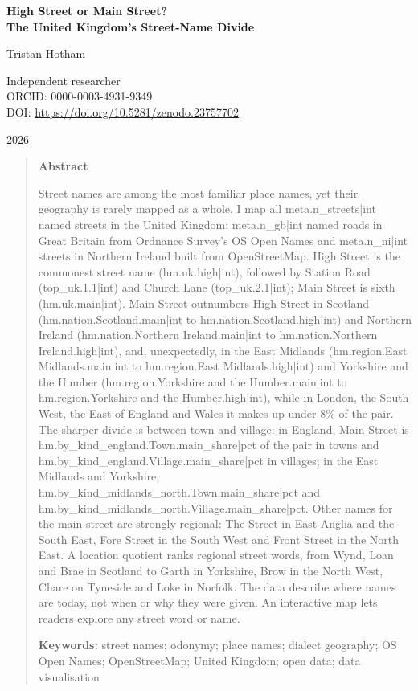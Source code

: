 \documentclass[11pt,a4paper]{article}
\begin{document}
\begin{center}
{\Large\bfseries High Street or Main Street?\\[2pt] The United Kingdom's Street-Name Divide\par}
\vspace{1.2em}
{\large Tristan Hotham\par}
\vspace{0.3em}
{\small Independent researcher\\
ORCID: 0000-0003-4931-9349\\
DOI: \href{https://doi.org/10.5281/zenodo.23757702}{https://doi.org/10.5281/zenodo.23757702}\par}
\vspace{0.8em}
2026
\end{center}

\begin{quote}
\small
\begin{center}\textbf{Abstract}\end{center}
Street names are among the most familiar place names, yet their geography is rarely mapped as a whole. I map all {{meta.n_streets|int}} named streets in the United Kingdom: {{meta.n_gb|int}} named roads in Great Britain from Ordnance Survey's OS Open Names and {{meta.n_ni|int}} streets in Northern Ireland built from OpenStreetMap. High Street is the commonest street name ({{hm.uk.high|int}}), followed by Station Road ({{top_uk.1.1|int}}) and Church Lane ({{top_uk.2.1|int}}); Main Street is sixth ({{hm.uk.main|int}}). Main Street outnumbers High Street in Scotland ({{hm.nation.Scotland.main|int}} to {{hm.nation.Scotland.high|int}}) and Northern Ireland ({{hm.nation.Northern Ireland.main|int}} to {{hm.nation.Northern Ireland.high|int}}), and, unexpectedly, in the East Midlands ({{hm.region.East Midlands.main|int}} to {{hm.region.East Midlands.high|int}}) and Yorkshire and the Humber ({{hm.region.Yorkshire and the Humber.main|int}} to {{hm.region.Yorkshire and the Humber.high|int}}), while in London, the South West, the East of England and Wales it makes up under 8\% of the pair. The sharper divide is between town and village: in England, Main Street is {{hm.by_kind_england.Town.main_share|pct}} of the pair in towns and {{hm.by_kind_england.Village.main_share|pct}} in villages; in the East Midlands and Yorkshire, {{hm.by_kind_midlands_north.Town.main_share|pct}} and {{hm.by_kind_midlands_north.Village.main_share|pct}}. Other names for the main street are strongly regional: The Street in East Anglia and the South East, Fore Street in the South West and Front Street in the North East. A location quotient ranks regional street words, from Wynd, Loan and Brae in Scotland to Garth in Yorkshire, Brow in the North West, Chare on Tyneside and Loke in Norfolk. The data describe where names are today, not when or why they were given. An interactive map lets readers explore any street word or name.

\textbf{Keywords:} street names; odonymy; place names; dialect geography; OS Open Names; OpenStreetMap; United Kingdom; open data; data visualisation
\end{quote}
\end{document}
